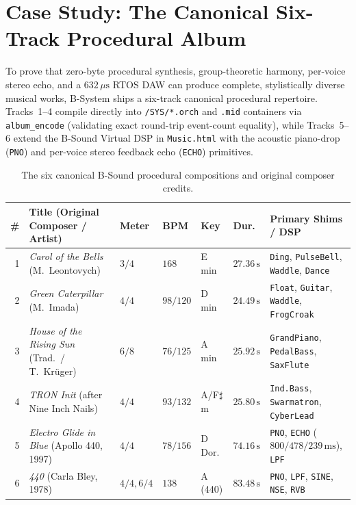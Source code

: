 \chapter{Case Study: The Canonical Six-Track Procedural Album}
\label{ch:album}

To prove that zero-byte procedural synthesis, group-theoretic harmony, per-voice stereo echo, and a $632\,\mu\text{s}$ RTOS DAW can produce complete, stylistically diverse musical works, B-System ships a six-track canonical procedural repertoire. Tracks~1--4 compile directly into \texttt{/SYS/*.orch} and \texttt{.mid} containers via \texttt{album\_encode} (validating exact round-trip event-count equality), while Tracks~5--6 extend the B-Sound Virtual DSP in \texttt{Music.html} with the acoustic piano-drop (\texttt{PNO}) and per-voice stereo feedback echo (\texttt{ECHO}) primitives.

\begin{table}[htbp]
\centering
\caption{The six canonical B-Sound procedural compositions and original composer credits.}
\scriptsize
\begin{tabular}{@{}rllllll@{}}
\toprule
\# & Title (Original Composer / Artist) & Meter & BPM & Key & Dur. & Primary Shims / DSP \\
\midrule
1 & \emph{Carol of the Bells} (M.\ Leontovych) & $3/4$ & $168$ & E min & $27.36\,\text{s}$ & \texttt{Ding}, \texttt{PulseBell}, \texttt{Waddle}, \texttt{Dance} \\
2 & \emph{Green Caterpillar} (M.\ Imada) & $4/4$ & $98/120$ & D min & $24.49\,\text{s}$ & \texttt{Float}, \texttt{Guitar}, \texttt{Waddle}, \texttt{FrogCroak} \\
3 & \emph{House of the Rising Sun} (Trad.\ / T.\ Kr\"uger) & $6/8$ & $76/125$ & A min & $25.92\,\text{s}$ & \texttt{GrandPiano}, \texttt{PedalBass}, \texttt{SaxFlute} \\
4 & \emph{TRON Init} (after Nine Inch Nails) & $4/4$ & $93/132$ & A/F$\sharp$m & $25.80\,\text{s}$ & \texttt{Ind.Bass}, \texttt{Swarmatron}, \texttt{CyberLead} \\
5 & \emph{Electro Glide in Blue} (Apollo 440, 1997) & $4/4$ & $78/156$ & D Dor. & $74.16\,\text{s}$ & \texttt{PNO}, \texttt{ECHO} ($800/478/239\,\text{ms}$), \texttt{LPF} \\
6 & \emph{440} (Carla Bley, 1978) & $4/4, 6/4$ & $138$ & A (440) & $83.48\,\text{s}$ & \texttt{PNO}, \texttt{LPF}, \texttt{SINE}, \texttt{NSE}, \texttt{RVB} \\
\bottomrule
\end{tabular}
\end{table}

